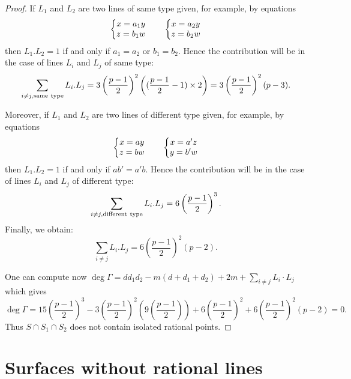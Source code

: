 \documentclass[12pt]{amsart}
\theoremstyle{definition}
\begin{document}
\begin{proof}
If $L_1$ and $L_2$ are two lines of same type given, for example, by equations
\begin{equation*}
\left\{
\begin{matrix}
x = a_1y   \\
z = b_1w \cr
\end{matrix}
\right.
\qquad
\left\{
\begin{matrix}
x = a_2y   \\
z = b_2w\cr
\end{matrix}
\right. 
\end{equation*}
then $L_1.L_2=1$ if and only if $a_1=a_2$ or $b_1=b_2$.
Hence the contribution will be in the case of lines $L_i$ and $L_j$ of same type:
$$\sum_{i\not=j, {\rm same\ type}}L_i.L_j=3\left(\frac{p-1}{2}\right)^2\left((\frac{p-1}{2}-1)\times 2\right)=3\left(\frac{p-1}{2}\right)^2(p-3).$$

Moreover, if $L_1$ and $L_2$ are two lines of different type given, for example, by equations
\begin{equation*}
\left\{
\begin{matrix}
x = ay   \\
z = bw \cr
\end{matrix}
\right.
\qquad
\left\{
\begin{matrix}
x = a'z   \\
y = b'w\cr
\end{matrix}
\right. 
\end{equation*}
then $L_1.L_2=1$ if and only if $ab'=a'b$.
Hence the contribution will be in the case of lines $L_i$ and $L_j$ of different type:
$$\sum_{i\not=j, {\rm different\  type}}L_i.L_j=6\left(\frac{p-1}{2}\right)^3.$$
Finally, we obtain:
$$\sum_{i\not=j}L_i.L_j=6\left(\frac{p-1}{2}\right)^2(p-2).$$

One can compute now 
$\deg\Gamma= dd_1d_2 - m(d+d_1+d_2)+2m+ \sum_{i \ne j} L_i\cdot L_j$ which gives
$$\deg\Gamma= 15\left(\frac{p-1}{2}\right)^3-3\left(\frac{p-1}{2}\right)^2\left(9\left(\frac{p-1}{2}\right)\right)+6\left(\frac{p-1}{2}\right)^2+6\left(\frac{p-1}{2}\right)^2(p-2)=0.$$
Thus $S\cap S_1\cap S_2$ does not contain isolated rational points.
\end{proof}








\section{Surfaces without rational lines}
\label{nolines}
\end{document}
